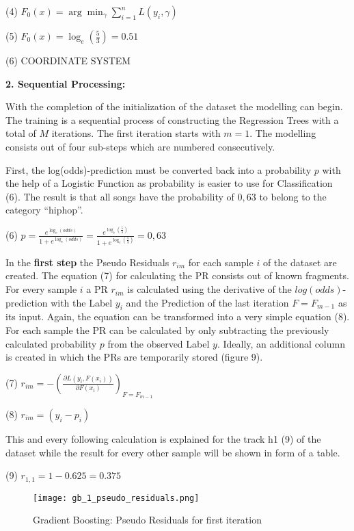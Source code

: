 (4) \(F_{0}(x) = \arg \min_{\gamma } \sum_{i= 1}^{n} L(y_{i}, \gamma) \)

(5) \(F_{0}(x) = \log_{e}(\frac{5}{3}) = 0.51\)

(6) COORDINATE SYSTEM

\textbf{2. Sequential Processing:}

With the completion of the initialization of the dataset the modelling can begin. The training is a sequential 
process of constructing the Regression Trees with a total of \(M\) iterations. The first iteration 
starts with \(m = 1\). The modelling consists out of four sub-steps which are numbered consecutively.

First, the log(odds)-prediction must be converted back into a probability \(p\) with the help of a 
Logistic Function as probability is easier to use for Classification (6). The result is 
that all songs have the probability of \(0,63\) to belong to the category “hiphop”.

(6) \(p = \frac{e^{\log_{e}(odds)}}{1 + e^{\log_{e}(odds)}} = \frac{e^{\log_{e}(\frac{5}{3})}}{1 + e^{\log_{e}(\frac{5}{3})}} = 0,63\)

In the \textbf{first step} the Pseudo Residuals \(r_{im}\) for each sample \(i\) of the dataset are created. The equation (7) 
for calculating the PR consists out of known fragments. For every sample \(i\) a PR \(r_{im}\) 
is calculated using the derivative of the \(log(odds)\)-prediction with the Label \(y_{i}\) and the 
Prediction of the last iteration \(F = F_{m - 1}\) as its input. Again, the equation can be 
transformed into a very simple equation (8). For each sample the PR can be calculated by only 
subtracting the previously calculated probability \(p\) from the observed Label \(y\). Ideally, an additional 
column is created in which the PRs are temporarily stored (figure 9). 

(7) \(r_{im} = - (\frac{\partial L(y_{i}, F(x_{i}))}{\partial F(x_{i})})_{F = F_{m - 1}} \)

(8) \(r_{im} = (y_{i} - p_{i})\)

This and every following calculation is explained for the track h1 (9) of the dataset while the result for 
every other sample will be shown in form of a table. 

(9) \(r_{1,1} = 1 - 0.625 = 0.375\)

\begin{figure}[H]
    \centering
    \caption[]{Gradient Boosting: Pseudo Residuals for first iteration}
	\label{gb_1_pseudo_residuals}
    \texttt{[image: gb\_1\_pseudo\_residuals.png]}
\end{figure}

